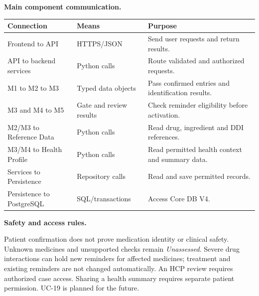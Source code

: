 \noindent\textbf{Main component communication.}\par\smallskip
\begingroup\small\renewcommand{\arraystretch}{1.08}
\begin{tabularx}{\textwidth}{|L{0.34\textwidth}|L{0.23\textwidth}|Y|}
\hline
\textbf{Connection} & \textbf{Means} & \textbf{Purpose} \\ \hline
Frontend to API & HTTPS/JSON & Send user requests and return results. \\ \hline
API to backend services & Python calls & Route validated and authorized requests. \\ \hline
M1 to M2 to M3 & Typed data objects & Pass confirmed entries and identification results. \\ \hline
M3 and M4 to M5 & Gate and review results & Check reminder eligibility before activation. \\ \hline
M2/M3 to Reference Data & Python calls & Read drug, ingredient and DDI references. \\ \hline
M3/M4 to Health Profile & Python calls & Read permitted health context and summary data. \\ \hline
Services to Persistence & Repository calls & Read and save permitted records. \\ \hline
Persistence to PostgreSQL & SQL/transactions & Access Core DB V4. \\ \hline
\end{tabularx}
\endgroup

\noindent\textbf{Safety and access rules.}\par\smallskip
Patient confirmation does not prove medication identity or clinical safety.
Unknown medicines and unsupported checks remain \emph{Unassessed}.
Severe drug interactions can hold new reminders for affected medicines;
treatment and existing reminders are not changed automatically.
An HCP review requires authorized case access. Sharing a health summary
requires separate patient permission. UC-19 is planned for the future.

\makeatletter
\providecommand{\LogicalResetPageColumns}{%
  \global\@colht\textheight
  \global\@colroom\textheight
  \global\vsize\textheight
}
\makeatother

